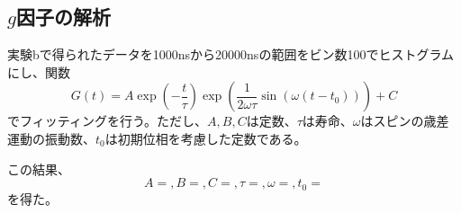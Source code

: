 \subsection{$g$因子の解析}
実験bで得られたデータを1000nsから20000nsの範囲をビン数100でヒストグラムにし、関数
\begin{equation}
G(t)=A\exp\left(-\frac{t}{\tau}\right)\exp\left(\frac{1}{2\omega\tau}\sin(\omega(t-t_0))\right)+C
\end{equation}
でフィッティングを行う。ただし、$A,B,C$は定数、$\tau$は寿命、$\omega$はスピンの歳差運動の振動数、$t_0$は初期位相を考慮した定数である。


この結果、
\begin{equation}
A= ,B= ,C= ,\tau= ,\omega= ,t_0=
\end{equation}
を得た。
